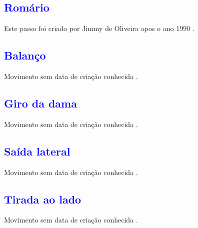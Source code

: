 \subsection{\textcolor{blue}{Romário}}
\label{subsec:passo:romario}
Este passo foi criado por Jimmy de Oliveira apos o ano 1990 \cite{sambafunkeadoJimmyDeOliveiraPart1}.





\subsection{\textcolor{blue}{Balanço}}
Movimento sem data de criação conhecida \cite[pp. 144]{perna2002samba}.

\subsection{\textcolor{blue}{Giro da dama}}
Movimento sem data de criação conhecida \cite[pp. 144]{perna2002samba}.

\subsection{\textcolor{blue}{Saída lateral}}
Movimento sem data de criação conhecida \cite[pp. 144]{perna2002samba}.

\subsection{\textcolor{blue}{Tirada ao lado}}
Movimento sem data de criação conhecida \cite[pp. 144]{perna2002samba}.

